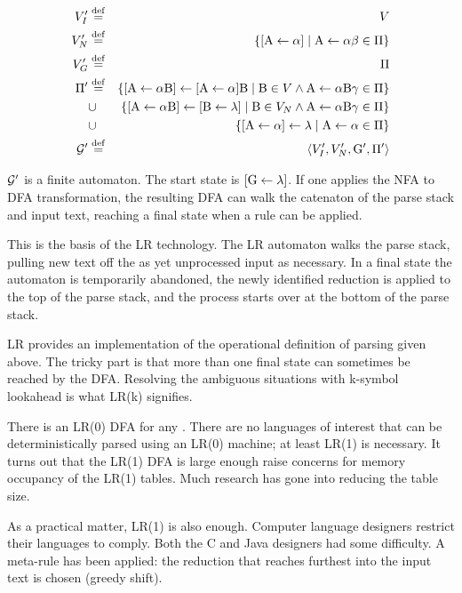 \begin{eqnarray*}
V_I' &\stackrel{\rm def}{=}& V                                                             \\
V_N' &\stackrel{\rm def}{=}& 
    \{[{\rm A}\leftarrow\alpha]\;|\;{\rm A}\leftarrow\alpha\beta\in\Pi\}     \\
V_G' &\stackrel{\rm def}{=}& \Pi                                                            \\
\Pi' &\stackrel{\rm def}{=}& 
   \{[{\rm A}\leftarrow\alpha{\rm B}]\leftarrow [{\rm A}\leftarrow\alpha]{\rm B} 
    \;|\; 
   {\rm B}\in V \wedge {\rm A}\leftarrow\alpha{\rm B}\gamma\in\Pi\}     \\
   &\cup& 
    \{[{\rm A}\leftarrow\alpha{\rm B}]\leftarrow[{\rm B}\leftarrow\lambda]
    \;|\; 
      {\rm B}\in V_N \wedge {\rm A}\leftarrow\alpha{\rm B}\gamma \in \Pi\} \\
   &\cup& 
      \{[{\rm A}\leftarrow\alpha]\leftarrow\lambda 
    \;|\; 
      {\rm A}\leftarrow\alpha \in \Pi\}                               \\
{\cal G}' &\stackrel{\rm def}{=}& \langle V_I', V_N', {\rm G}', \Pi'\rangle
\end{eqnarray*}

$\cal G'$ is a finite automaton.  
The start state is $[{\rm G}\leftarrow\lambda]$.
If one applies the NFA to DFA transformation, the
resulting DFA can walk the catenaton of the parse stack and input text,
reaching a final state when a rule can be applied.

This is the basis of the LR technology.  
The LR automaton walks the parse stack, 
pulling new text off the as yet unprocessed input as necessary.
In a final state the automaton is temporarily abandoned,
the newly identified reduction is applied to the top of the parse stack,
and the process starts over at the bottom of the parse stack.

LR provides an implementation of the operational definition of
parsing given above.  
The tricky part is that more than one final state can sometimes be
reached by the DFA.  
Resolving the ambiguous situations with k-symbol lookahead is what
LR(k) signifies.

There is an LR(0) DFA for any \cfg.
There are no languages of interest that can be deterministically parsed
using an LR(0) machine; at least LR(1) is necessary.
It turns out that the LR(1) DFA is large enough raise
concerns for memory occupancy of the LR(1) tables.
Much research has gone into reducing the table size.

As a practical matter, LR(1) is also enough.  
Computer language designers restrict their languages to comply.
Both the C and Java designers had some difficulty.
A meta-rule has been applied: the reduction that reaches
furthest into the input text is chosen (greedy shift).

